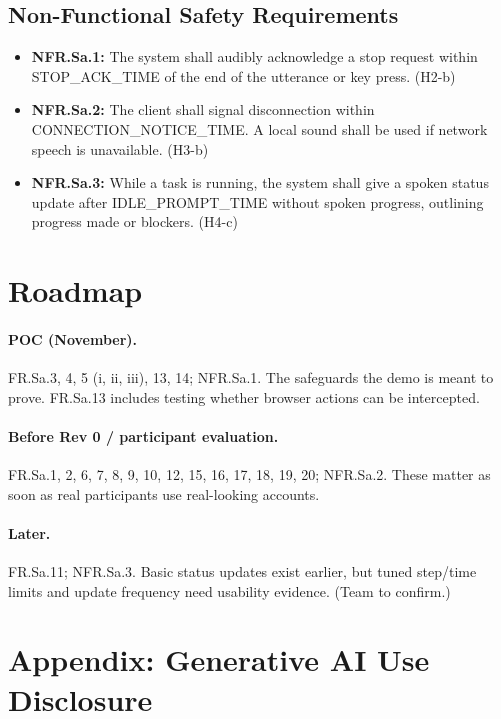 \documentclass{article}
\begin{document}
\subsection{Non-Functional Safety Requirements}

\begin{itemize}
  \item \textbf{NFR.Sa.1:} The system shall audibly acknowledge a stop request within STOP\_ACK\_TIME of the end of the utterance or key press. (H2-b)
  \item \textbf{NFR.Sa.2:} The client shall signal disconnection within CONNECTION\_NOTICE\_TIME. A local sound shall be used if network speech is unavailable. (H3-b)
  \item \textbf{NFR.Sa.3:} While a task is running, the system shall give a spoken status update after IDLE\_PROMPT\_TIME without spoken progress, outlining progress made or blockers. (H4-c)
\end{itemize}

\section{Roadmap}

\paragraph{POC (November).} FR.Sa.3, 4, 5 (i, ii, iii), 13, 14; NFR.Sa.1. The safeguards the demo is meant to prove. FR.Sa.13 includes testing whether browser actions can be intercepted.

\paragraph{Before Rev 0 / participant evaluation.} FR.Sa.1, 2, 6, 7, 8, 9, 10, 12, 15, 16, 17, 18, 19, 20; NFR.Sa.2. These matter as soon as real participants use real-looking accounts.

\paragraph{Later.} FR.Sa.11; NFR.Sa.3. Basic status updates exist earlier, but tuned step/time limits and update frequency need usability evidence. (Team to confirm.)

\newpage{}

\section{Appendix: Generative AI Use Disclosure}
\end{document}
